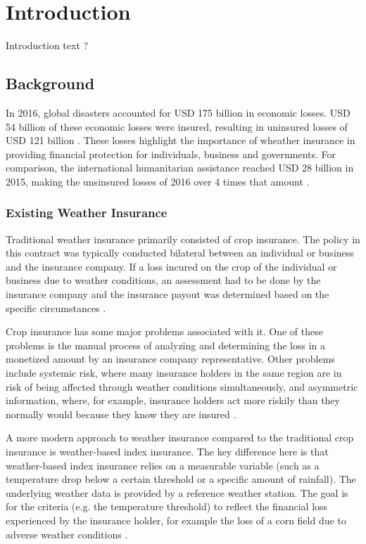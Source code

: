 \chapter{Introduction}\label{chapter:introduction} 

Introduction text ?



\section{Background}\label{section:background}
In 2016, global disasters accounted for USD 175 billion in economic losses. USD 54 billion of these economic losses were insured, resulting in uninsured losses of USD 121 billion \autocite{swissre2017}. These losses highlight the importance of wheather insurance in providing financial protection for individuals, business and governments. For comparison, the international humanitarian assistance reached USD 28 billion in 2015, making the unsinsured losses of 2016 over 4 times that amount \autocite{development2016humanitarian}.




\subsection{Existing Weather Insurance}
Traditional weather insurance primarily consisted of crop insurance. The policy in this contract was typically conducted bilateral between an individual or business and the insurance company. If  a loss incured on the crop of the individual or business due to weather conditions, an assessment had to be done by the insurance company and the insurance payout was  determined based on the specific circumstances \autocite{michler2022risk}.

 Crop insurance has some major problems associated with it. One of these problems is the manual process of analyzing and determining the loss in a monetized amount by an insurance company representative. Other problems include systemic risk, where many insurance holders in the same region are in risk of being affected through weather conditions simultaneously, and asymmetric information, where, for example, insurance holders act more riskily than they normally would because they know they are insured \autocite{makki2002crop}.

 \sloppy A more modern approach to weather insurance compared to the traditional crop insurance is weather-based index insurance. The key difference here is that weather-based index insurance relies on a measurable variable (such as a temperature drop below a certain threshold or a specific amount of rainfall). The underlying weather data is provided by a reference weather station. The goal is for the criteria (e.g. the temperature threshold) to reflect the financial loss experienced by the insurance holder, for example the loss of a corn field due to adverse weather conditions \autocite{kajwang2022weather}.


